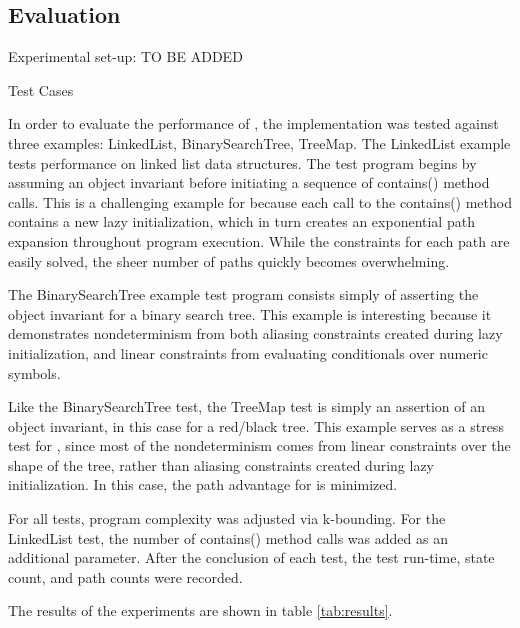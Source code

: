 \subsection{Evaluation} 
Experimental set-up: TO BE ADDED

Test Cases

In order to evaluate the performance of \symtxt{}, the implementation was tested against three examples: LinkedList, BinarySearchTree, TreeMap.
The LinkedList example tests performance on linked list data structures. The test program begins by assuming an object invariant before initiating a sequence of contains() method calls. This is a challenging example for \gsetxt{} because each call to the contains() method contains a new lazy initialization, which in turn creates an exponential path expansion throughout program execution. While the constraints for each path are easily solved, the sheer number of paths quickly becomes overwhelming.

The BinarySearchTree example test program consists simply of asserting the object invariant for a binary search tree. This example is interesting because it demonstrates nondeterminism from both aliasing constraints created during lazy initialization, and linear constraints from evaluating conditionals over numeric symbols. 

Like the BinarySearchTree test, the TreeMap test is simply an assertion of an object invariant, in this case for a red/black tree. This example serves as a stress test for \symtxt{}, since most of the nondeterminism comes from linear constraints over the shape of the tree, rather than aliasing constraints created during lazy initialization. In this case, the path advantage for \symtxt{} is minimized.

For all tests, program complexity was adjusted via k-bounding. For the LinkedList test, the number of contains() method calls was added as an additional parameter. After the conclusion of each test, the test run-time, state count, and path counts were recorded. 

The results of the experiments are shown in table \ref{tab:results}.

